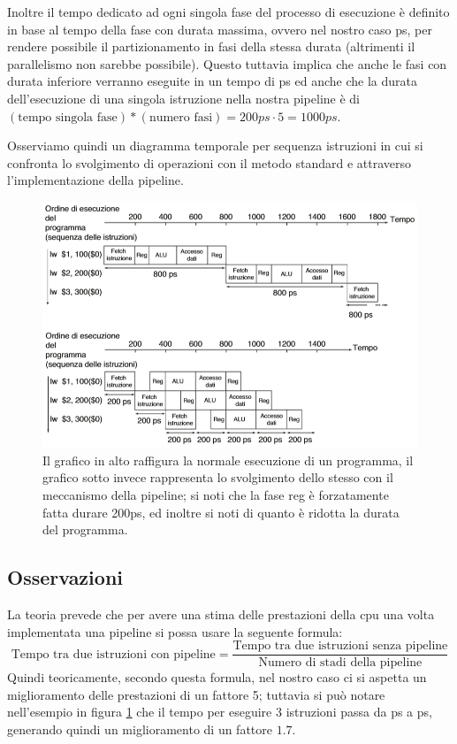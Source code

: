 \documentclass[class=book, crop=false, oneside]{standalone}
\begin{document}
Inoltre il tempo dedicato ad ogni singola fase del processo di esecuzione è definito in base al tempo della fase con durata massima, ovvero nel nostro caso \unit[200]{ps}, per rendere possibile il partizionamento in fasi della stessa durata (altrimenti il parallelismo non sarebbe possibile).
Questo tuttavia implica che anche le fasi con durata inferiore verranno eseguite in un tempo di \unit[200]{ps} ed anche che la durata dell'esecuzione di una singola istruzione nella nostra pipeline è di \((\textrm{tempo singola fase})*(\textrm{numero fasi})=200ps\cdot 5=1000ps\).

Osserviamo quindi un diagramma temporale per sequenza istruzioni in cui si confronta lo svolgimento di operazioni con il metodo standard e attraverso l'implementazione della pipeline.
\begin{figure}[H]
	\centering
	\includegraphics[width=\textwidth,keepaspectratio]{esecuzione-operazioni-confronto.png}
	\caption{\label{esempioPipeline}Il grafico in alto raffigura la normale esecuzione di un programma, il grafico sotto invece rappresenta lo svolgimento dello stesso con il meccanismo della pipeline; si noti che la fase reg è forzatamente fatta durare 200ps, ed inoltre si noti di quanto è ridotta la durata del programma.}
\end{figure}

\subsection{Osservazioni}
La teoria prevede che per avere una stima delle prestazioni della \acrshort{cpu} una volta implementata una pipeline si possa usare la seguente formula:
\begin{equation*}
\text{Tempo tra due istruzioni con pipeline} = \frac{\text{Tempo tra due istruzioni senza pipeline}}{\text{Numero di stadi della pipeline}}
\end{equation*}
Quindi teoricamente, secondo questa formula, nel nostro caso ci si aspetta un miglioramento delle prestazioni di un fattore 5; tuttavia si può notare nell'esempio in figura \ref{esempioPipeline} che il tempo per eseguire 3 istruzioni passa da \unit[2400]{ps} a \unit[1400]{ps}, generando quindi un miglioramento di un fattore \(1.7\).
\end{document}
